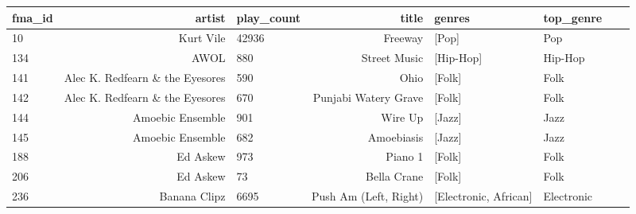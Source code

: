 \documentclass{article}
\begin{document}
\begin{table}
\tiny{
\centering
\begin{tabular}{lrlrllll}
\toprule
 fma\_id &                                             artist &  play\_count &                                              title &                                             genres &            top\_genre  \\
 \toprule
    10 &                                          Kurt Vile &       42936 &                                            Freeway &                                              [Pop] &                  Pop  \\
    134 &                                               AWOL &         880 &                                       Street Music &                                          [Hip-Hop] &              Hip-Hop  \\
     141 &                    Alec K. Redfearn \& the Eyesores &         590 &                                               Ohio &                                             [Folk] &                 Folk  \\
     142 &                    Alec K. Redfearn \& the Eyesores &         670 &                               Punjabi Watery Grave &                                             [Folk] &                 Folk  \\
    144 &                                   Amoebic Ensemble &         901 &                                            Wire Up &                                             [Jazz] &                 Jazz  \\
   145 &                                   Amoebic Ensemble &         682 &                                         Amoebiasis &                                             [Jazz] &                 Jazz  \\
    188 &                                           Ed Askew &         973 &                                            Piano 1 &                                             [Folk] &                 Folk  \\
     206 &                                           Ed Askew &          73 &                                        Bella Crane &                                             [Folk] &                 Folk \\
     236 &                                       Banana Clipz &        6695 &                              Push Am (Left, Right) &                              [Electronic, African] &           Electronic  \\

\end{tabular}}
\end{table}
\end{document}
